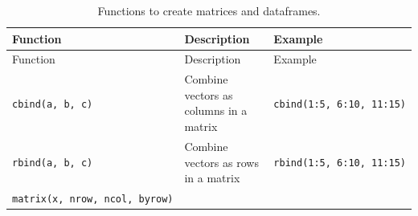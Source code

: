 \documentclass[]{book}
\theoremstyle{definition}
\theoremstyle{definition}
\theoremstyle{remark}
\begin{document}
\begin{longtable}[]{@{}lll@{}}
\caption{\label{tab:matrixfunctions} Functions to create matrices and
dataframes.}\tabularnewline
\toprule
\begin{minipage}[b]{0.19\columnwidth}\raggedright\strut
Function\strut
\end{minipage} & \begin{minipage}[b]{0.27\columnwidth}\raggedright\strut
Description\strut
\end{minipage} & \begin{minipage}[b]{0.41\columnwidth}\raggedright\strut
Example\strut
\end{minipage}\tabularnewline
\midrule
\endfirsthead
\toprule
\begin{minipage}[b]{0.19\columnwidth}\raggedright\strut
Function\strut
\end{minipage} & \begin{minipage}[b]{0.27\columnwidth}\raggedright\strut
Description\strut
\end{minipage} & \begin{minipage}[b]{0.41\columnwidth}\raggedright\strut
Example\strut
\end{minipage}\tabularnewline
\midrule
\endhead
\begin{minipage}[t]{0.19\columnwidth}\raggedright\strut
\texttt{cbind(a,\ b,\ c)}\strut
\end{minipage} & \begin{minipage}[t]{0.27\columnwidth}\raggedright\strut
Combine vectors as columns in a matrix\strut
\end{minipage} & \begin{minipage}[t]{0.41\columnwidth}\raggedright\strut
\texttt{cbind(1:5,\ 6:10,\ 11:15)}\strut
\end{minipage}\tabularnewline
\begin{minipage}[t]{0.19\columnwidth}\raggedright\strut
\texttt{rbind(a,\ b,\ c)}\strut
\end{minipage} & \begin{minipage}[t]{0.27\columnwidth}\raggedright\strut
Combine vectors as rows in a matrix\strut
\end{minipage} & \begin{minipage}[t]{0.41\columnwidth}\raggedright\strut
\texttt{rbind(1:5,\ 6:10,\ 11:15)}\strut
\end{minipage}\tabularnewline
\begin{minipage}[t]{0.19\columnwidth}\raggedright\strut
\texttt{matrix(x,\ nrow,\ ncol,\ byrow)}\strut
\end{minipage} & \begin{minipage}[t]{0.27\columnwidth}\raggedright\strut

\end{minipage}
\end{longtable}
\end{document}
